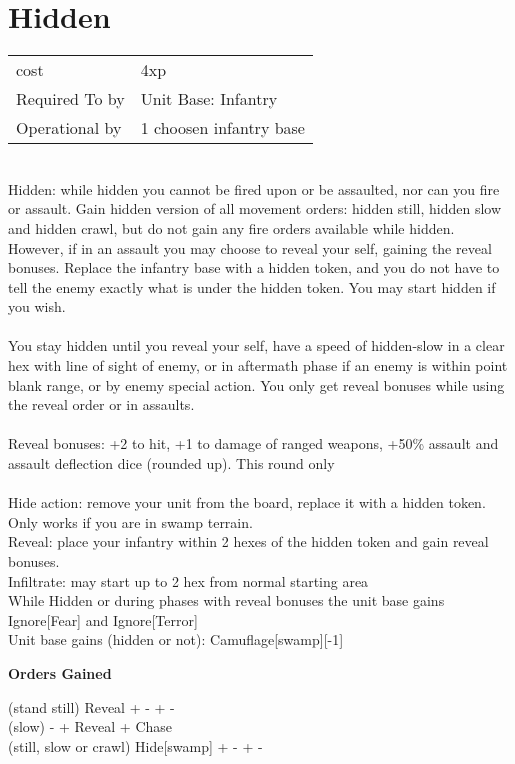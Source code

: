 \section{ Hidden }

\begin{tabular}{ll}
  cost & 4xp\\
  Required To by & Unit Base: Infantry\\
  Operational by & 1 choosen infantry base\\

\end{tabular}
\ \\
Hidden: while hidden you cannot be fired upon or be assaulted, nor can you fire or assault. Gain hidden version of all movement orders: hidden still, hidden slow and hidden crawl,  but do not gain any fire orders available while hidden. However, if in an assault you may choose to reveal your self, gaining the reveal bonuses. Replace the infantry base with a hidden token, and you do not have to tell the enemy exactly what is under the hidden token. You may start hidden if you wish. \\ \ \\ You stay hidden until you reveal your self, have a speed of hidden-slow in a clear hex with line of sight of enemy, or in aftermath phase if an enemy is within point blank range, or by enemy special action. You only get reveal bonuses while using the reveal order or in assaults. \\ \ \\ Reveal bonuses: +2 to hit, +1 to damage of ranged weapons, +50\% assault and assault deflection dice (rounded up). This round only \\ \ \\ Hide action: remove your unit from the board, replace it with a hidden token. Only works if you are in swamp terrain. \\ Reveal: place your infantry within 2 hexes of the hidden token and gain reveal bonuses.\\ Infiltrate: may start up to 2 hex from normal starting area\\ While Hidden or during phases with reveal bonuses the unit base gains Ignore[Fear] and Ignore[Terror] \\ Unit base gains (hidden or not): Camuflage[swamp][-1]

{\bf Orders Gained    }

\noindent (stand still) Reveal + - + - \\(slow) - + Reveal + Chase\\(still, slow or crawl) Hide[swamp] + - + -\\

